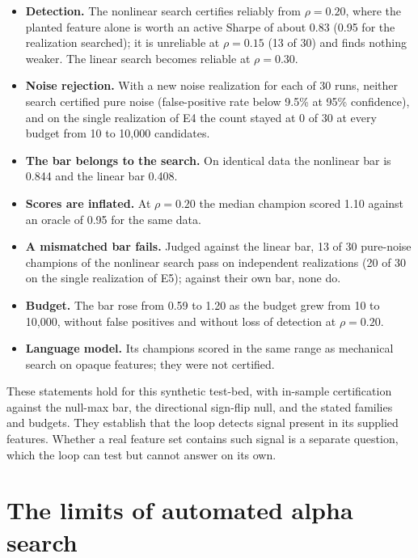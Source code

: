 \documentclass[11pt]{article}
\begin{document}
\begin{itemize}[leftmargin=1.4em]
\item \textbf{Detection.} The nonlinear search certifies reliably from $\rho=0.20$, where the planted
feature alone is worth an active Sharpe of about 0.83 (0.95 for the realization searched); it is
unreliable at $\rho=0.15$ (13 of 30) and finds nothing weaker. The linear search becomes reliable at
$\rho=0.30$.
\item \textbf{Noise rejection.} With a new noise realization for each of 30 runs, neither search
certified pure noise (false-positive rate below 9.5\% at 95\% confidence), and on the single realization
of E4 the count stayed at 0 of 30
at every budget from 10 to 10{,}000 candidates.
\item \textbf{The bar belongs to the search.} On identical data the nonlinear bar is 0.844 and the linear
bar 0.408.
\item \textbf{Scores are inflated.} At $\rho=0.20$ the median champion scored 1.10 against an oracle of
0.95 for the same data.
\item \textbf{A mismatched bar fails.} Judged against the linear bar, 13 of 30 pure-noise champions of
the nonlinear search pass on independent realizations (20 of 30 on the single realization of E5);
against their own bar, none do.
\item \textbf{Budget.} The bar rose from 0.59 to 1.20 as the budget grew from 10 to 10{,}000, without
false positives and without loss of detection at $\rho=0.20$.
\item \textbf{Language model.} Its champions scored in the same range as mechanical search on opaque
features; they were not certified.
\end{itemize}

These statements hold for this synthetic test-bed, with in-sample certification against the null-max
bar, the directional sign-flip null, and the stated families and budgets. They establish that the loop
detects signal present in its supplied features. Whether a real feature set contains such signal is a
separate question, which the loop can test but cannot answer on its own.

\section{The limits of automated alpha search}
\label{sec:ceiling}
\end{document}
